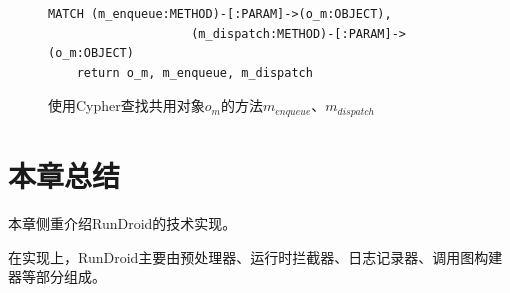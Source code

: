 \begin{figure}[!h]
	\centering
	\begin{lstlisting}[style=normal,language=cypher]
	MATCH (m_enqueue:METHOD)-[:PARAM]->(o_m:OBJECT),
					(m_dispatch:METHOD)-[:PARAM]->(o_m:OBJECT)
	return o_m, m_enqueue, m_dispatch\end{lstlisting}
	\caption{使用Cypher查找共用对象$o_m$的方法$m_{enqueue}$、$m_{dispatch}$}
	\label{fig:cypher_code}
\end{figure}


 \section{本章总结}



本章侧重介绍RunDroid的技术实现。

在实现上，RunDroid主要由预处理器、运行时拦截器、日志记录器、调用图构建器等部分组成。





